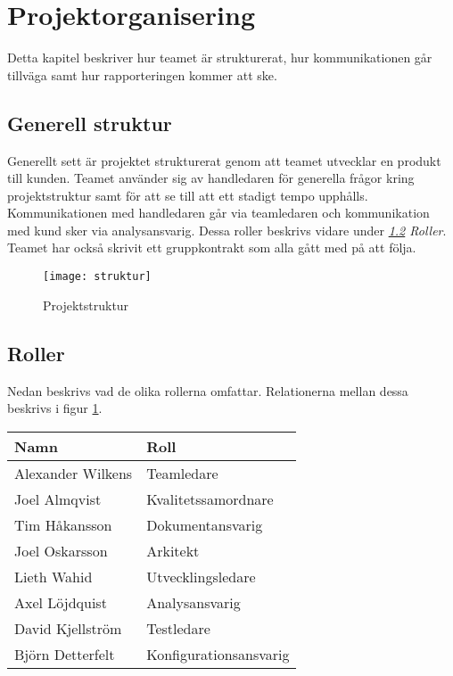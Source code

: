 \section{Projektorganisering}
Detta kapitel beskriver hur teamet är strukturerat, hur kommunikationen går tillväga samt hur rapporteringen kommer att ske.

\subsection{Generell struktur}
Generellt sett är projektet strukturerat genom att teamet utvecklar en produkt till kunden. Teamet använder sig av
handledaren för generella frågor kring projektstruktur samt för att se till att ett stadigt tempo upphålls.
Kommunikationen med handledaren går via teamledaren och kommunikation med kund sker via analysansvarig. Dessa roller
beskrivs vidare under \textit{\ref{subsec:roles} Roller}. Teamet har också skrivit ett gruppkontrakt\cite{bib-gruppkontrakt} som alla gått med på att följa.

\begin{figure}[h]
    \centering
    \texttt{[image: struktur]}
    \caption{Projektstruktur}
    \label{fig:struktur}
\end{figure}



\subsection{Roller}
\label{subsec:roles}
Nedan beskrivs vad de olika rollerna omfattar. Relationerna mellan dessa beskrivs i figur \ref{fig:struktur}.

    \begin{tabular}{| l | l |}
        \hline
        \textbf{Namn} & \textbf{Roll} \\
        \hline
        \centering Alexander Wilkens & Teamledare\\
        \hline
        \centering Joel Almqvist & Kvalitetssamordnare\\
        \hline
        \centering Tim Håkansson & Dokumentansvarig\\
        \hline
        \centering Joel Oskarsson & Arkitekt\\
        \hline
        \centering Lieth Wahid & Utvecklingsledare\\
        \hline
        \centering Axel Löjdquist & Analysansvarig\\
        \hline
        \centering David Kjellström & Testledare\\
        \hline
        \centering Björn Detterfelt & Konfigurationsansvarig\\
        \hline
    \end{tabular}


